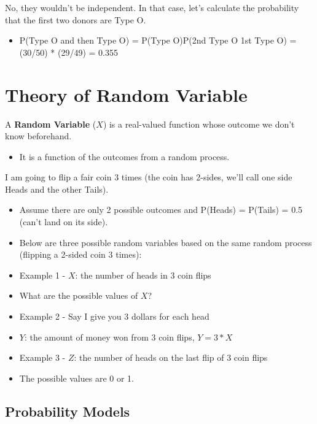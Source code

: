 \documentclass[
]{book}
\providecommand{\tightlist}{%
  \setlength{\itemsep}{0pt}\setlength{\parskip}{0pt}}
\begin{document}
No, they wouldn't be independent. In that case, let's calculate the probability that the first two donors are Type O.

\begin{itemize}
\tightlist
\item
  P(Type O and then Type O) = P(Type O)P(2nd Type O \textbar{} 1st Type O) = (30/50) * (29/49) = 0.355
\end{itemize}

\section{Theory of Random Variable}\label{theory-of-random-variable}

A \textbf{Random Variable} (\(X\)) is a real-valued function whose outcome we don't know beforehand.

\begin{itemize}
\tightlist
\item
  It is a function of the outcomes from a random process.
\end{itemize}

I am going to flip a fair coin 3 times (the coin has 2-sides, we'll call one side Heads and the other Tails).

\begin{itemize}
\item
  Assume there are only 2 possible outcomes and P(Heads) = P(Tails) = 0.5 (can't land on its side).
\item
  Below are three possible random variables based on the same random process (flipping a 2-sided coin 3 times):
\item
  Example 1 - \(X\): the number of heads in 3 coin flips
\item
  What are the possible values of \(X\)?
\item
  Example 2 - Say I give you 3 dollars for each head
\item
  \(Y\): the amount of money won from 3 coin flips, \(Y = 3*X\)
\item
  Example 3 - \(Z\): the number of heads on the last flip of 3 coin flips
\item
  The possible values are 0 or 1.
\end{itemize}

\subsection{Probability Models}\label{probability-models-1}
\end{document}
